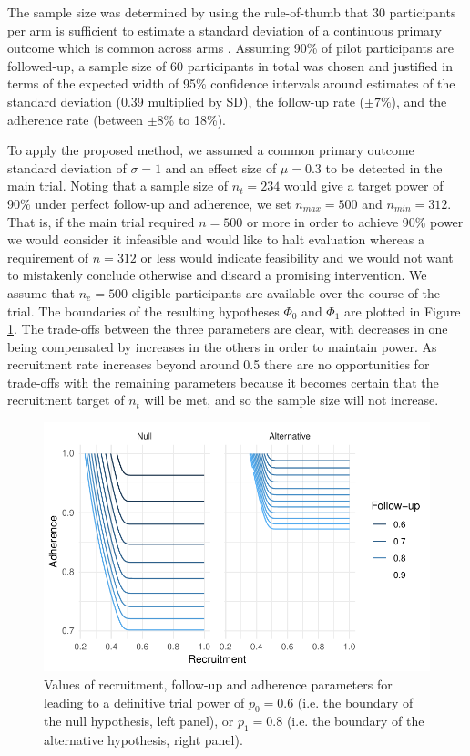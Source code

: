 \documentclass[AMA,STIX1COL]{WileyNJD-v2}
\begin{document}
The sample size was determined by using the rule-of-thumb that 30 participants per arm is sufficient to estimate a standard deviation of a continuous primary outcome which is common across arms \cite{Lancaster2004}. Assuming 90\% of pilot participants are followed-up, a sample size of 60 participants in total was chosen and justified in terms of the expected width of 95\% confidence intervals around estimates of the standard deviation (0.39 multiplied by SD), the follow-up rate ($\pm 7$\%), and the adherence rate (between $\pm 8$\% to 18\%).

To apply the proposed method, we assumed a common primary outcome standard deviation of $\sigma = 1$ and an effect size of $\mu = 0.3$ to be detected in the main trial. Noting that a sample size of  $n_t = 234$ would give a target power of 90\% under perfect follow-up and adherence, we set $n_{max} = 500$ and $n_{min} = 312$. That is, if the main trial required $n = 500$ or more in order to achieve 90\% power we would consider it infeasible and would like to halt evaluation whereas a requirement of $n = 312$ or less would indicate feasibility and we would not want to mistakenly conclude otherwise and discard a promising intervention. We assume that $n_e = 500$ eligible participants are available over the course of the trial. The boundaries of the resulting hypotheses $\Phi_0$ and $\Phi_1$ are plotted in Figure \ref{fig:hyps}. The trade-offs between the three parameters are clear, with decreases in one being compensated by increases in the others in order to maintain power. As recruitment rate increases beyond around 0.5 there are no opportunities for trade-offs with the remaining parameters because it becomes certain that the recruitment target of $n_t$ will be met, and so the sample size will not increase.

\begin{figure}
\centering
\includegraphics[scale=0.8]{./Figures/hyps.pdf}
\caption{Values of recruitment, follow-up and adherence parameters for leading to a definitive trial power of $p_0 = 0.6$ (i.e. the boundary of the null hypothesis, left panel), or $p_1 = 0.8$ (i.e. the boundary of the alternative hypothesis, right panel).}
\label{fig:hyps}
\end{figure}
\end{document}
